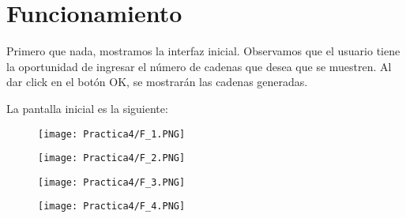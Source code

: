 \documentclass[12pt]{article}
\begin{document}

	\section{Funcionamiento}
	Primero que nada, mostramos la interfaz inicial. Observamos que el 
	usuario tiene la oportunidad de ingresar el número de cadenas que 
	desea que se muestren. Al dar click en el botón OK, se mostrarán 
	las cadenas generadas.

	La pantalla inicial es la siguiente:
	
	\begin{figure}[H]
	        \centering
	        \texttt{[image: Practica4/F\_1.PNG]}
	\end{figure}
	
	\begin{figure}[H]
	        \centering
	        \texttt{[image: Practica4/F\_2.PNG]}
	\end{figure}
	
	\begin{figure}[H]
	        \centering
	        \texttt{[image: Practica4/F\_3.PNG]}
	\end{figure}

	\begin{figure}[H]
	        \centering
	        \texttt{[image: Practica4/F\_4.PNG]}
	\end{figure}
\end{document}

